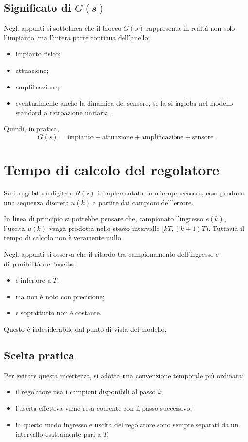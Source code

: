 \subsection{Significato di \(G(s)\)}

Negli appunti si sottolinea che il blocco \(G(s)\) rappresenta in realtà non solo l'impianto,
ma l'intera parte continua dell'anello:
\begin{itemize}
    \item impianto fisico;
    \item attuazione;
    \item amplificazione;
    \item eventualmente anche la dinamica del sensore,
    se la si ingloba nel modello standard a retroazione unitaria.
\end{itemize}

Quindi, in pratica,
\[
G(s)=\text{impianto}+\text{attuazione}+\text{amplificazione}+\text{sensore}.
\]

\section{Tempo di calcolo del regolatore}

Se il regolatore digitale \(R(z)\) è implementato su microprocessore,
esso produce una sequenza discreta \(u(k)\) a partire dai campioni dell'errore.

In linea di principio si potrebbe pensare che, campionato l'ingresso \(e(k)\),
l'uscita \(u(k)\) venga prodotta nello stesso intervallo \([kT,(k+1)T)\).
Tuttavia il tempo di calcolo non è veramente nullo.

Negli appunti si osserva che il ritardo tra campionamento dell'ingresso
e disponibilità dell'uscita:
\begin{itemize}
    \item è inferiore a \(T\);
    \item ma non è noto con precisione;
    \item e soprattutto non è costante.
\end{itemize}

Questo è indesiderabile dal punto di vista del modello.

\subsection{Scelta pratica}

Per evitare questa incertezza, si adotta una convenzione temporale più ordinata:
\begin{itemize}
    \item il regolatore usa i campioni disponibili al passo \(k\);
    \item l'uscita effettiva viene resa coerente con il passo successivo;
    \item in questo modo ingresso e uscita del regolatore sono sempre separati da un intervallo esattamente pari a \(T\).
\end{itemize}

